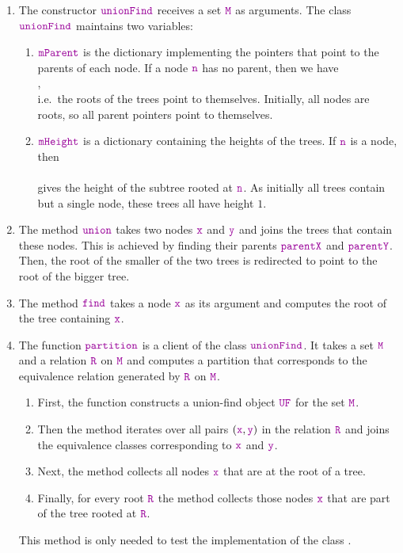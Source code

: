 \begin{enumerate}
\item The constructor $\mytt{unionFind}$ receives a set $\mytt{M}$ as arguments.  The class
      $\mytt{unionFind}$ maintains two variables:
      \begin{enumerate}
      \item $\mytt{mParent}$ is the dictionary implementing the pointers that point to the parents
             of each node.  If a node $\mytt{n}$ has no parent, then we have
             \\[0.2cm]
             \hspace*{1.3cm}
             ,
             \\[0.2cm]
             i.e.~the roots of the trees point to themselves.  Initially, all nodes are roots, so
             all parent pointers point to themselves.
      \item $\mytt{mHeight}$ is a dictionary containing the heights of the trees.  If $\mytt{n}$ is
            a node, then
            \\[0.2cm]
            \hspace*{1.3cm}
            \\[0.2cm]
            gives the height of the subtree rooted at $\mytt{n}$. As initially all trees contain but
            a single node, these trees all have height $1$.
      \end{enumerate}
\item The method $\mytt{union}$ takes two nodes $\mytt{x}$ and $\mytt{y}$ and joins the trees that
      contain these nodes.  This is achieved by finding their parents $\mytt{parentX}$ and
      $\mytt{parentY}$.  Then, the root of the smaller of the two trees is redirected to point to
      the root of the bigger tree.
\item The method $\mytt{find}$ takes a node $\mytt{x}$ as its argument and computes the root of the
      tree containing $\mytt{x}$. 
\item The function $\mytt{partition}$ is a client of the class $\mytt{unionFind}$.  It takes a set
      $\mytt{M}$ and a relation $\mytt{R}$ on $\mytt{M}$ and computes a partition that corresponds
      to the equivalence relation generated by $\mytt{R}$ on $\mytt{M}$. 
      \begin{enumerate}
      \item First, the function constructs a union-find object $\mytt{UF}$ for the set $\mytt{M}$.
      \item Then the method iterates over all pairs $(\mytt{x},\mytt{y})$ in the relation $\mytt{R}$ and
            joins the equivalence classes corresponding to $\mytt{x}$ and $\mytt{y}$.
      \item Next, the method collects all nodes $\mytt{x}$ that are at the root of a tree.
      \item Finally, for every root $\mytt{R}$ the method collects those nodes $\mytt{x}$ that are
            part of the tree rooted at $\mytt{R}$.
      \end{enumerate}
      This method is only needed to test the implementation of the class .
\end{enumerate}


